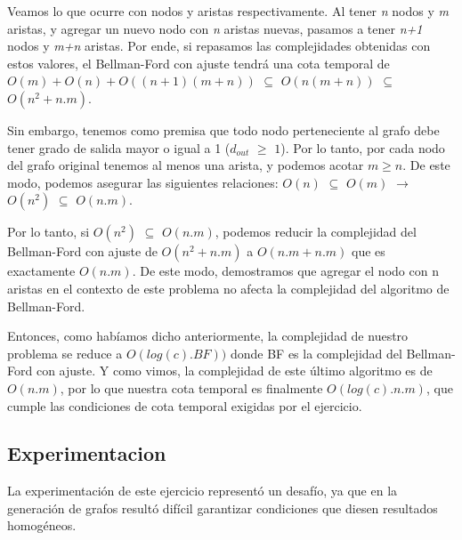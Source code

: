 Veamos lo que ocurre con nodos y aristas respectivamente. Al tener \textit{n} nodos y \textit{m} aristas, y agregar un nuevo nodo con \textit{n} aristas nuevas, pasamos a tener \textit{n+1} nodos y \textit{m+n} aristas. Por ende, si repasamos las complejidades obtenidas con estos valores, el Bellman-Ford con ajuste tendrá una cota temporal de $O(m) + O(n) + O((n+1)(m+n))$ $\subseteq$ $O(n(m+n))$ $\subseteq$ $O(n^2 + n.m)$.

Sin embargo, tenemos como premisa que todo nodo perteneciente al grafo debe tener grado de salida mayor o igual a 1 ($d_{out}$ $\geq$ $1$). Por lo tanto, por cada nodo del grafo original tenemos al menos una arista, y podemos acotar $m \geq n$. De este modo, podemos asegurar las siguientes relaciones: $O(n)$ $\subseteq$ $O(m)$ $\rightarrow$ $O(n^2)$ $\subseteq$ $O(n.m)$.

Por lo tanto, si $O(n^2)$ $\subseteq$ $O(n.m)$, podemos reducir la complejidad del Bellman-Ford con ajuste de $O(n^2 + n.m)$ a $O(n.m + n.m)$ que es exactamente $O(n.m)$. De este modo, demostramos que agregar el nodo con n aristas en el contexto de este problema no afecta la complejidad del algoritmo de Bellman-Ford.

Entonces, como habíamos dicho anteriormente, la complejidad de nuestro problema se reduce a $O(log(c).BF))$ donde BF es la complejidad del Bellman-Ford con ajuste. Y como vimos, la complejidad de este último algoritmo es de $O(n.m)$, por lo que nuestra cota temporal es finalmente $O(log(c).n.m)$, que cumple las condiciones de cota temporal exigidas por el ejercicio.

\subsection{Experimentacion}

La experimentación de este ejercicio representó un desafío, ya que en la generación de grafos resultó difícil garantizar condiciones que diesen resultados homogéneos.

